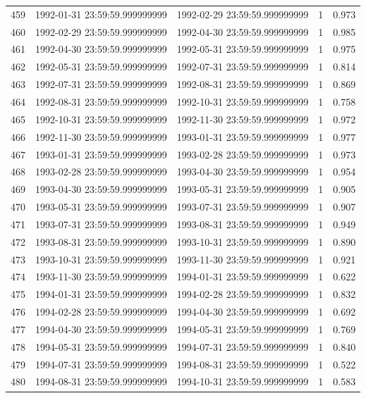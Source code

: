 \begin{table}
\begin{tabular}{lcccc}
459 & 1992-01-31 23:59:59.999999999 & 1992-02-29 23:59:59.999999999 & 1 & 0.973 \\
460 & 1992-02-29 23:59:59.999999999 & 1992-04-30 23:59:59.999999999 & 1 & 0.985 \\
461 & 1992-04-30 23:59:59.999999999 & 1992-05-31 23:59:59.999999999 & 1 & 0.975 \\
462 & 1992-05-31 23:59:59.999999999 & 1992-07-31 23:59:59.999999999 & 1 & 0.814 \\
463 & 1992-07-31 23:59:59.999999999 & 1992-08-31 23:59:59.999999999 & 1 & 0.869 \\
464 & 1992-08-31 23:59:59.999999999 & 1992-10-31 23:59:59.999999999 & 1 & 0.758 \\
465 & 1992-10-31 23:59:59.999999999 & 1992-11-30 23:59:59.999999999 & 1 & 0.972 \\
466 & 1992-11-30 23:59:59.999999999 & 1993-01-31 23:59:59.999999999 & 1 & 0.977 \\
467 & 1993-01-31 23:59:59.999999999 & 1993-02-28 23:59:59.999999999 & 1 & 0.973 \\
468 & 1993-02-28 23:59:59.999999999 & 1993-04-30 23:59:59.999999999 & 1 & 0.954 \\
469 & 1993-04-30 23:59:59.999999999 & 1993-05-31 23:59:59.999999999 & 1 & 0.905 \\
470 & 1993-05-31 23:59:59.999999999 & 1993-07-31 23:59:59.999999999 & 1 & 0.907 \\
471 & 1993-07-31 23:59:59.999999999 & 1993-08-31 23:59:59.999999999 & 1 & 0.949 \\
472 & 1993-08-31 23:59:59.999999999 & 1993-10-31 23:59:59.999999999 & 1 & 0.890 \\
473 & 1993-10-31 23:59:59.999999999 & 1993-11-30 23:59:59.999999999 & 1 & 0.921 \\
474 & 1993-11-30 23:59:59.999999999 & 1994-01-31 23:59:59.999999999 & 1 & 0.622 \\
475 & 1994-01-31 23:59:59.999999999 & 1994-02-28 23:59:59.999999999 & 1 & 0.832 \\
476 & 1994-02-28 23:59:59.999999999 & 1994-04-30 23:59:59.999999999 & 1 & 0.692 \\
477 & 1994-04-30 23:59:59.999999999 & 1994-05-31 23:59:59.999999999 & 1 & 0.769 \\
478 & 1994-05-31 23:59:59.999999999 & 1994-07-31 23:59:59.999999999 & 1 & 0.840 \\
479 & 1994-07-31 23:59:59.999999999 & 1994-08-31 23:59:59.999999999 & 1 & 0.522 \\
480 & 1994-08-31 23:59:59.999999999 & 1994-10-31 23:59:59.999999999 & 1 & 0.583 \\

\end{tabular}
\end{table}

